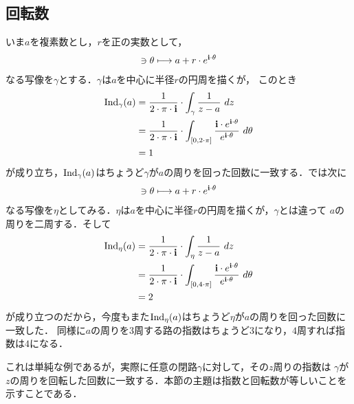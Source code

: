\subsection{回転数}
	
	いま$a$を複素数とし，$r$を正の実数として，
	\begin{align}
		[0,2 \cdot \pi] \ni \theta \longmapsto a + r \cdot e^{\isym \cdot \theta}
	\end{align}
	なる写像を$\gamma$とする．$\gamma$は$a$を中心に半径$r$の円周を描くが，
	このとき
	\begin{align}
		\Ind_{\gamma}(a) 
		&= \frac{1}{2\cdot\pi\cdot\isym} \cdot \int_{\gamma} \frac{1}{z-a}\ dz \\
		&= \frac{1}{2\cdot\pi\cdot\isym} \cdot \int_{[0,2\cdot\pi]} \frac{\isym \cdot e^{\isym \cdot \theta}}{e^{\isym \cdot \theta}}\ d\theta \\
		&= 1
	\end{align}
	が成り立ち，$\operatorname{Ind}_{\gamma}(a)$はちょうど$\gamma$が$a$の周りを回った回数に一致する．では次に
	\begin{align}
		[0,4 \cdot \pi] \ni \theta \longmapsto a + r \cdot e^{\isym \cdot \theta}
	\end{align}
	なる写像を$\eta$としてみる．$\eta$は$a$を中心に半径$r$の円周を描くが，$\gamma$とは違って
	$a$の周りを二周する．そして
	\begin{align}
		\Ind_{\eta}(a) 
		&= \frac{1}{2\cdot\pi\cdot\isym} \cdot \int_{\eta} \frac{1}{z-a}\ dz \\
		&= \frac{1}{2\cdot\pi\cdot\isym} \cdot \int_{[0,4\cdot\pi]} \frac{\isym \cdot e^{\isym \cdot \theta}}{e^{\isym \cdot \theta}}\ d\theta \\
		&= 2
	\end{align}
	が成り立つのだから，今度もまた$\operatorname{Ind}_{\eta}(a)$はちょうど$\eta$が$a$の周りを回った回数に一致した．
	同様に$a$の周りを$3$周する路の指数はちょうど$3$になり，$4$周すれば指数は$4$になる．
	
	これは単純な例であるが，実際に任意の閉路$\gamma$に対して，その$z$周りの指数は
	$\gamma$が$z$の周りを回転した回数に一致する．本節の主題は指数と回転数が等しいことを示すことである．
	
	\begin{screen}
		\begin{dfn}[回転数]
			
		\end{dfn}
	\end{screen}